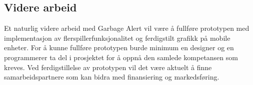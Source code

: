 \subsection{Videre arbeid}
Et naturlig videre arbeid med Garbage Alert vil være å fullføre prototypen med implementasjon av flerspillerfunksjonalitet og ferdigstilt grafikk på mobile enheter. For å kunne fullføre prototypen burde minimum en designer og en programmerer ta del i prosjektet for å oppnå den samlede kompetansen som kreves. Ved ferdigstillelse av prototypen vil det være aktuelt å finne samarbeidspartnere som kan bidra med finansiering og markedsføring.
